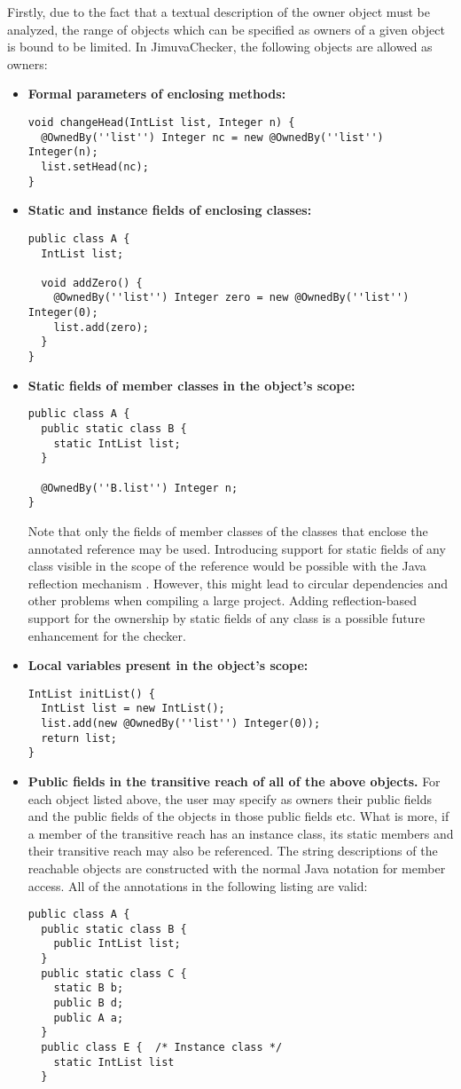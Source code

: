 \documentclass{pracamgr}
\theoremstyle{break}
\theoremstyle{break}
\theoremstyle{break}
\begin{document}
Firstly, due to the fact that a textual description of the owner
object must be analyzed, the range of objects which can be specified
as owners of a given object is bound to be limited. In JimuvaChecker,
the following objects are allowed as owners:
\begin{itemize}
\item \textbf{Formal parameters of enclosing methods:}
  \begin{lstlisting}
void changeHead(IntList list, Integer n) {
  @OwnedBy(''list'') Integer nc = new @OwnedBy(''list'') Integer(n);
  list.setHead(nc);
}
  \end{lstlisting}
\item \textbf{Static and instance fields of enclosing classes:}
  \begin{lstlisting}
public class A {
  IntList list;

  void addZero() {
    @OwnedBy(''list'') Integer zero = new @OwnedBy(''list'') Integer(0);
    list.add(zero);
  }
}
\end{lstlisting}
\item \textbf{Static fields of member classes in the object's scope:}
  \begin{lstlisting}
public class A {
  public static class B {
    static IntList list;
  }

  @OwnedBy(''B.list'') Integer n;
}
\end{lstlisting}
Note that only the fields of member classes of the classes that
enclose the annotated reference may be used. Introducing support for
static fields of any class visible in the scope of the reference would
be possible with the Java reflection mechanism
\cite{reflection}. However, this might lead to circular dependencies
and other problems when compiling a large project. Adding
reflection-based support for the ownership by static fields of any
class is a possible future enhancement for the checker.
\item \textbf{Local variables present in the object's scope:}
\begin{lstlisting}
IntList initList() {
  IntList list = new IntList();
  list.add(new @OwnedBy(''list'') Integer(0)); 
  return list;
}
\end{lstlisting}
\item \textbf{Public fields in the transitive reach of all of the
    above objects.} For each object listed above, the user may specify
  as owners their public fields and the public fields of the objects
  in those public fields etc. What is more, if a member of the
  transitive reach has an instance class, its static members and their
  transitive reach may also be referenced. The string descriptions of
  the reachable objects are constructed with the normal Java notation
  for member access. All of the annotations in the following listing
  are valid:
  \begin{lstlisting}
public class A {
  public static class B {
    public IntList list;
  }
  public static class C {
    static B b;
    public B d;
    public A a;
  }
  public class E {  /* Instance class */
    static IntList list
  }
  

\end{lstlisting}
\end{itemize}
\end{document}
